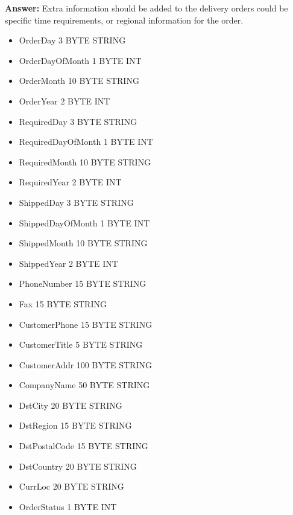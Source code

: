 \documentclass[a4paper,11pt]{article}
\begin{document}
\noindent
\textbf{Answer:} Extra information should be added to the delivery orders could be specific time requirements, or regional information for the order.
\begin{multicols}{2}
    \begin{itemize}
        \setlength{\itemsep}{0cm}
        \setlength{\parskip}{0cm}
        \item OrderDay {\color{RoyalBlue}3 BYTE STRING}
        \item OrderDayOfMonth {\color{RoyalBlue}1 BYTE INT}
        \item OrderMonth {\color{RoyalBlue}10 BYTE STRING}
        \item OrderYear {\color{RoyalBlue}2 BYTE INT}
        \item RequiredDay {\color{RoyalBlue}3 BYTE STRING}
        \item RequiredDayOfMonth {\color{RoyalBlue}1 BYTE INT}
        \item RequiredMonth {\color{RoyalBlue}10 BYTE STRING}
        \item RequiredYear {\color{RoyalBlue}2 BYTE INT}
        \item ShippedDay {\color{RoyalBlue}3 BYTE STRING}
        \item ShippedDayOfMonth {\color{RoyalBlue}1 BYTE INT}
        \item ShippedMonth {\color{RoyalBlue}10 BYTE STRING}
        \item ShippedYear {\color{RoyalBlue}2 BYTE INT}
        \item PhoneNumber {\color{RoyalBlue}15 BYTE STRING}
        \item Fax {\color{RoyalBlue}15 BYTE STRING}
        \item CustomerPhone {\color{RoyalBlue}15 BYTE STRING}
        \item CustomerTitle {\color{RoyalBlue}5 BYTE STRING}
        \item CustomerAddr {\color{RoyalBlue}100 BYTE STRING}
        \item CompanyName {\color{RoyalBlue}50 BYTE STRING}
        \item DstCity {\color{RoyalBlue}20 BYTE STRING}
        \item DstRegion {\color{RoyalBlue}15 BYTE STRING}
        \item DstPostalCode {\color{RoyalBlue}15 BYTE STRING}
        \item DstCountry {\color{RoyalBlue}20 BYTE STRING}
        \item CurrLoc {\color{RoyalBlue}20 BYTE STRING}
        \item OrderStatus {\color{RoyalBlue}1 BYTE INT}
    \end{itemize}
\end{multicols}
\end{document}
